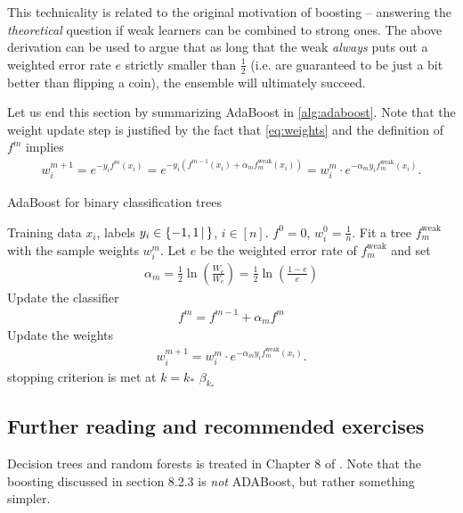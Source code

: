 \documentclass{article}
\newcommand{\set}[2]{\{ #1 \, \vert \, #2\}}
\newcommand{\weak}{\mathrm{weak}}
\begin{document}
This technicality is related to the original motivation of boosting -- answering the \emph{theoretical} question if weak learners can be combined to strong ones. The above derivation can be used to argue that as long that the weak \emph{always} puts out a weighted error rate $e$ strictly smaller than $\tfrac{1}{2}$ (i.e. are guaranteed to be just a bit better than flipping a coin), the ensemble will ultimately succeed. \newline

Let us end this section by summarizing AdaBoost in \eqref{alg:adaboost}. Note that the weight update step is justified by the fact that  \eqref{eq:weights} and the definition of $f^m$ implies 
\begin{align*}
    w_i^{m+1} =e^{-y_if^{m}(x_i)} = e^{-y_i(f^{m-1}(x_i)+\alpha_mf_m^\weak(x_i))} = w_i^m \cdot e^{-\alpha_m y_if_m^\weak (x_i)}.
\end{align*}

\begin{algorithm}[tb]      
	\caption{AdaBoost for binary classification trees} 
	\label{alg:adaboost}
	\begin{algorithmic} [1]
 		\REQUIRE Training data $x_i$, labels $y_i \in \set{-1,1}$, $i\in [n]$.
 		\STATE $f^0=0$, $w_i^0 = \tfrac{1}{n}$.
 		\REPEAT
 			\STATE Fit a tree $f_m^\weak$ with the sample weights $w_i^{m}$.
            \STATE Let $e$ be the weighted error rate of $f_m^\weak$ and set 
            \begin{align*}
                \alpha_m =  \frac{1}{2}\ln\left(\frac{W_c}{W_e}\right) = \frac{1}{2}\ln\left(\frac{1-e}{e}\right)
            \end{align*}
            \STATE Update the classifier
            \begin{align*}
                f^m = f^{m-1}+\alpha_m f^m
            \end{align*}
            \STATE Update the weights
            \begin{align*}
                w_i^{m+1} = w_i^{m}\cdot e^{-\alpha_m y_if_m^\weak (x_i)}.
            \end{align*}
 		\UNTIL stopping criterion is met at $k= k_*$
 		\RETURN $\beta_{k_*}$
	\end{algorithmic}
\end{algorithm}

\subsection{Further reading and recommended exercises}
Decision trees and random forests is treated in Chapter 8 of \cite{james2023introduction}. Note that the boosting discussed in section 8.2.3 is \emph{not} ADABoost, but rather something simpler.
\end{document}
